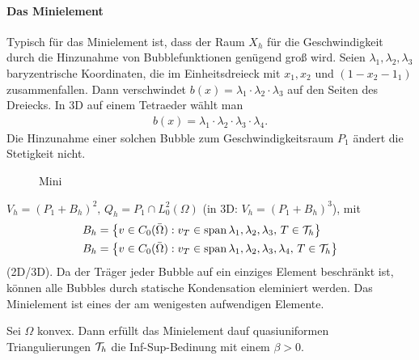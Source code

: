 \paragraph{Das Minielement}
\label{sec:das-minielement}

Typisch für das Minielement ist, dass der Raum $X_{h}$ für die Geschwindigkeit durch die Hinzunahme von Bubblefunktionen genügend groß wird. Seien $\lambda_{1}, \lambda_{2}, \lambda_{3}$ baryzentrische Koordinaten, die im Einheitsdreieck mit $x_{1}, x_{2}$ und $(1- x_{2} - 1_{1})$ zusammenfallen. Dann verschwindet $b(x) = \lambda_{1}\cdot \lambda_{2}\cdot \lambda_{3}$ auf den Seiten des Dreiecks. In 3D auf einem Tetraeder wählt man
\begin{align*}
  b(x) = \lambda_{1}\cdot \lambda_{2}\cdot \lambda_{3}\cdot \lambda_{4}. 
\end{align*}
Die Hinzunahme einer solchen Bubble zum Geschwindigkeitsraum $P_{1}$ ändert die Stetigkeit nicht. 
\begin{figure}[h!]
  \centering
  \caption{Mini}
  \label{fig:mini}
\end{figure}
$V_{h} = (P_{1} + B_{h})^{2}, \, Q_{h} = P_{1} \cap L_{0}^{2}(\Omega)$ (in 3D: $V_{h}=(P_{1} + B_{h})^{3}$), mit
\begin{align*}
  B_{h} &= \left\{ v \in C_{0}(\bar \Omega): v_{T} \in \operatorname{span}{\lambda_{1}, \lambda_{2}, \lambda_{3}}, \, T \in {\cal T}_{h} \right\}\\
  B_{h} &= \left\{ v \in C_{0}(\bar \Omega): v_{T} \in \operatorname{span}{\lambda_{1}, \lambda_{2}, \lambda_{3}, \lambda_{4}}, \, T \in {\cal T}_{h} \right\}
\end{align*}
(2D/3D). Da der Träger jeder Bubble auf ein einziges Element beschränkt ist, können alle Bubbles durch statische Kondensation eleminiert werden. 
Das Minielement ist eines der am wenigesten aufwendigen Elemente.
\begin{satz}
  Sei $\Omega$ konvex. Dann erfüllt das Minielement dauf quasiuniformen Triangulierungen ${\cal T}_{h}$ die Inf-Sup-Bedinung mit einem $\beta > 0$. 
\end{satz}
